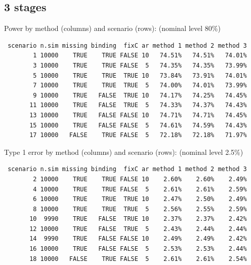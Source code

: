 \documentclass[12pt]{article}
\begin{document}
\clearpage

\subsection{3 stages}
\label{sec:orge44b5dd}

Power by method (columns) and scenario (rows): \hfill (nominal level 80\%)
\begin{verbatim}
 scenario n.sim missing binding  fixC ar method 1 method 2 method 3
        1 10000    TRUE    TRUE FALSE 10   74.51%   74.51%   74.01%
        3 10000    TRUE    TRUE FALSE  5   74.35%   74.35%   73.99%
        5 10000    TRUE    TRUE  TRUE 10   73.84%   73.91%   74.01%
        7 10000    TRUE    TRUE  TRUE  5   74.00%   74.01%   73.99%
        9 10000    TRUE   FALSE  TRUE 10   74.17%   74.25%   74.45%
       11 10000    TRUE   FALSE  TRUE  5   74.33%   74.37%   74.43%
       13 10000    TRUE   FALSE FALSE 10   74.71%   74.71%   74.45%
       15 10000    TRUE   FALSE FALSE  5   74.61%   74.59%   74.43%
       17 10000   FALSE    TRUE FALSE  5   72.18%   72.18%   71.97%
\end{verbatim}

\bigskip

Type 1 error by method (columns) and scenario (rows): \hfill (nominal level 2.5\%)
\begin{verbatim}
 scenario n.sim missing binding  fixC ar method 1 method 2 method 3
        2 10000    TRUE    TRUE FALSE 10    2.60%    2.60%    2.49%
        4 10000    TRUE    TRUE FALSE  5    2.61%    2.61%    2.59%
        6 10000    TRUE    TRUE  TRUE 10    2.47%    2.50%    2.49%
        8 10000    TRUE    TRUE  TRUE  5    2.56%    2.55%    2.59%
       10  9990    TRUE   FALSE  TRUE 10    2.37%    2.37%    2.42%
       12 10000    TRUE   FALSE  TRUE  5    2.43%    2.44%    2.44%
       14  9990    TRUE   FALSE FALSE 10    2.49%    2.49%    2.42%
       16 10000    TRUE   FALSE FALSE  5    2.53%    2.53%    2.44%
       18 10000   FALSE    TRUE FALSE  5    2.61%    2.61%    2.54%
\end{verbatim}

\clearpage
\end{document}
